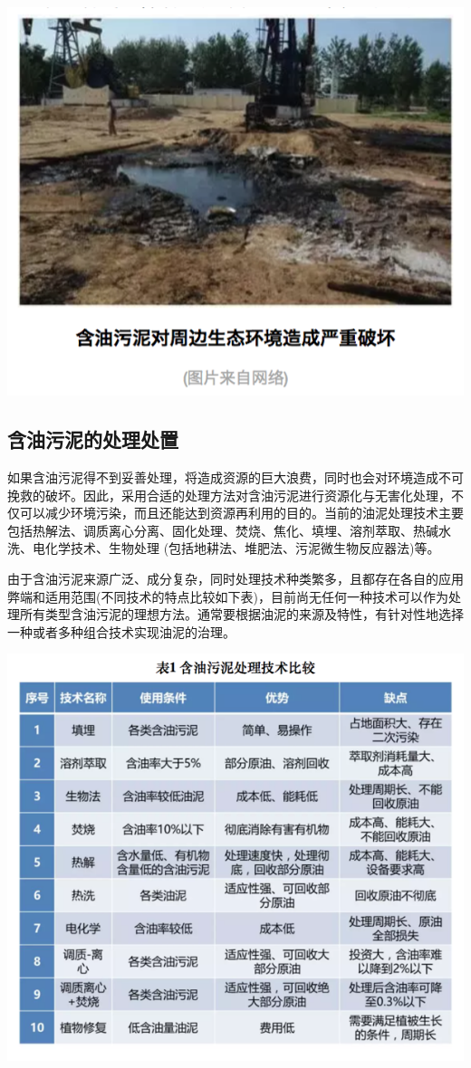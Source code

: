 \documentclass[
]{book}
\begin{document}
\includegraphics[width=8.33in]{images/youni8}

\hypertarget{ux542bux6cb9ux6c61ux6ce5ux7684ux5904ux7406ux5904ux7f6e}{%
\subsection{含油污泥的处理处置}\label{ux542bux6cb9ux6c61ux6ce5ux7684ux5904ux7406ux5904ux7f6e}}

如果含油污泥得不到妥善处理，将造成资源的巨大浪费，同时也会对环境造成不可挽救的破坏。因此，采用合适的处理方法对含油污泥进行资源化与无害化处理，不仅可以减少环境污染，而且还能达到资源再利用的目的。当前的油泥处理技术主要包括热解法、调质离心分离、固化处理、焚烧、焦化、填埋、溶剂萃取、热碱水洗、电化学技术、生物处理 (包括地耕法、堆肥法、污泥微生物反应器法)等。

由于含油污泥来源广泛、成分复杂，同时处理技术种类繁多，且都存在各自的应用弊端和适用范围(不同技术的特点比较如下表)，目前尚无任何一种技术可以作为处理所有类型含油污泥的理想方法。通常要根据油泥的来源及特性，有针对性地选择一种或者多种组合技术实现油泥的治理。

\includegraphics[width=8.33in]{images/youni9}
\end{document}
